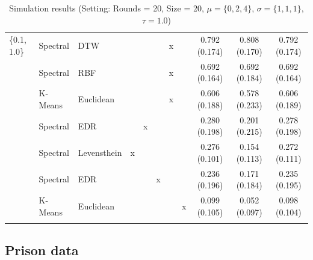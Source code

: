 \documentclass[12pt,a4paper,bibliography=totocnumbered,listof=totocnumbered]{scrartcl}
\begin{document}
{\begin{appendix}
\begin{table}[H]
\begin{tabularx}{\textwidth}{ lllcccccccc}
\{0.1, 1.0\} & Spectral  & DTW &  &  &  & x &  & 0.792 (0.174) & 0.808 (0.170) & 0.792 (0.174) \\ 
& Spectral  & RBF &  &  &  & x &  & 0.692 (0.164) & 0.692 (0.184) & 0.692 (0.164) \\ 
& K-Means & Euclidean  &  &  &  & x &  & 0.606 (0.188) & 0.578 (0.233) & 0.606 (0.189) \\ 
& Spectral  & EDR &  & x &  &  &  & 0.280 (0.198) & 0.201 (0.215) & 0.278 (0.198) \\ 
& Spectral  & Levensthein & x &  &  &  &  & 0.276 (0.101) & 0.154 (0.113) & 0.272 (0.111) \\ 
& Spectral  & EDR &  &  & x &  &  & 0.236 (0.196) & 0.171 (0.184) & 0.235 (0.195) \\ 
& K-Means & Euclidean  &  &  &  &  & x & 0.099 (0.105) & 0.052 (0.097) & 0.098 (0.104) \\ 
\hline \\[-1.8ex] 
	\end{tabularx} 
	\caption{Simulation results (Setting: Rounds = 20, Size = 20, $\mu = \{0,2,4\}$, $\sigma =  \{1,1,1\}$, $\tau = 1.0$)} 
		\label{tab:apstab8}
\end{table} 

\subsection{Prison data}


\end{appendix}}
\end{document}
